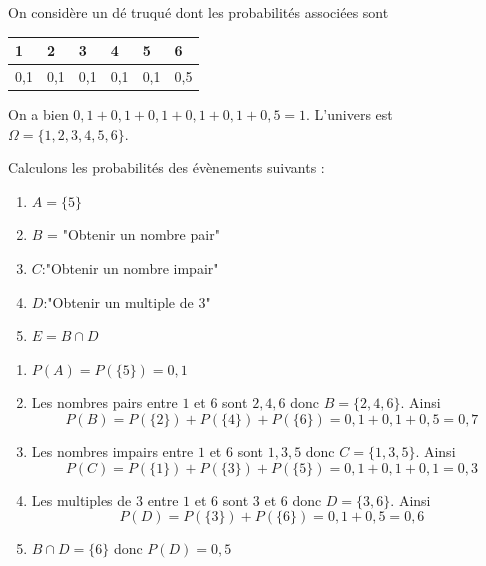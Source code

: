 \begin{exemple}
On considère un dé truqué dont les probabilités associées sont\newline


\begin{tabularx}{\linewidth}{| X | X | X | X | X | X |}
\hline
1 & 2 & 3 & 4 & 5 & 6 \\ \hline
0,1 & 0,1 & 0,1 & 0,1 & 0,1 & 0,5 \\ \hline
\end{tabularx}


On a bien $0,1 + 0,1 + 0,1 + 0,1 + 0,1 + 0,5 = 1$. L'univers est $\Omega = \{1,2,3,4,5,6\}$. \newline

Calculons les probabilités des évènements suivants : \begin{enumerate}\item $A = \{5\}$ \item $B$ = "Obtenir un nombre pair" \item $C$:"Obtenir un nombre impair" \item $D$:"Obtenir un multiple de $3$" \item $E = B \cap D$\end{enumerate}
\begin{enumerate}
\item $P(A) = P(\{5\}) = 0,1$
\item Les nombres pairs entre $1$ et $6$ sont $2,4,6$ donc $B = \{2,4,6\}$. Ainsi $$P(B) = P(\{2\}) + P(\{4\}) + P(\{6\}) = 0,1+0,1+0,5 = 0,7$$
\item Les nombres impairs entre $1$ et $6$ sont $1,3,5$ donc $C = \{1,3,5\}$. Ainsi $$P(C) = P(\{1\}) + P(\{3\}) + P(\{5\}) = 0,1+0,1+0,1 = 0,3$$
\item Les multiples de $3$ entre $1$ et $6$ sont $3$ et $6$ donc $D = \{3,6\}$. Ainsi $$P(D) = P(\{3\}) + P(\{6\}) = 0,1 + 0,5 = 0,6$$
\item $B \cap D = \{6\}$ donc $P(D) = 0,5$
\end{enumerate}
\end{exemple}
\newline

